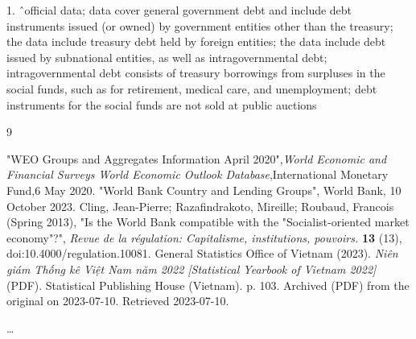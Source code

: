 \documentclass{article}
\begin{document}
1. \^\ official data; data cover general government debt and include debt instruments issued (or owned) by government entities other than the treasury; the data include treasury debt held by foreign entities; the data include debt issued by subnational entities, as well as intragovernmental debt; intragovernmental debt consists of treasury borrowings from surpluses in the social funds, such as for retirement, medical care, and unemployment; debt instruments for the social funds are not sold at public auctions


\begin{thebibliography}{9}

    "WEO Groups and Aggregates Information April 2020",\emph{World Economic and Financial Surveys World Economic Outlook Database},International Monetary Fund,6 May 2020.
     "World Bank Country and Lending Groups", World Bank, 10 October 2023.
     Cling, Jean-Pierre; Razafindrakoto, Mireille; Roubaud, Francois (Spring 2013), "Is the World Bank compatible with the "Socialist-oriented market economy"?", \textit{Revue de la régulation: Capitalisme, institutions, pouvoirs.} \textbf{13} (13), doi:10.4000/regulation.10081.
      General Statistics Office of Vietnam (2023). \textit{Niên giám Thống kê Việt Nam năm 2022 [Statistical Yearbook of Vietnam 2022]} (PDF). Statistical Publishing House (Vietnam). p. 103. Archived (PDF) from the original on 2023-07-10. Retrieved 2023-07-10.
    


\end{thebibliography}
\dots
\end{document}
